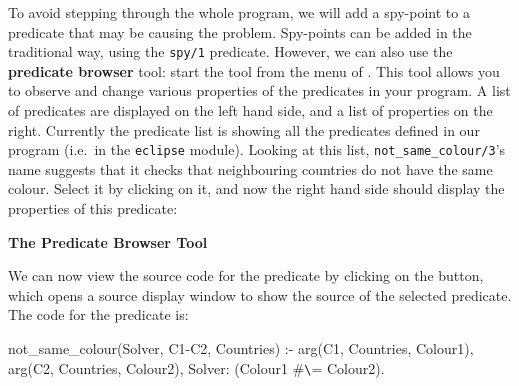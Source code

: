 To avoid stepping through the whole program, we will add a spy-point to a
predicate that may be causing the problem. Spy-points can be added in the
traditional way, using the \verb'spy/1' predicate. However, we can also use
the {\bf predicate browser} tool:  start the  tool
from the  menu of {\tkeclipse}. This tool allows you to observe
and change various properties of the predicates in your program.
A list of predicates are displayed
on the left hand side, and a list of properties on the right.
Currently the predicate list is showing all the predicates defined in our program (i.e.\ in
the \verb'eclipse' module). Looking at this list,
\verb'not_same_colour/3''s name suggests that
it checks that neighbouring countries do not have the same colour.
Select it by clicking on it, and now the right
hand side should display the properties of this predicate:

\begin{center}

\vspace{3mm}
{\bf The Predicate Browser Tool}
\end{center}

We can now view the source code for the predicate by clicking on the
 button, which opens a source display window to show the
source of the selected predicate. The code for the predicate is:

\begin{code}
not_same_colour(Solver, C1-C2, Countries) :-
      arg(C1, Countries, Colour1),
      arg(C2, Countries, Colour2),
      Solver: (Colour1 #\verb'\'= Colour2).
\end{code}


